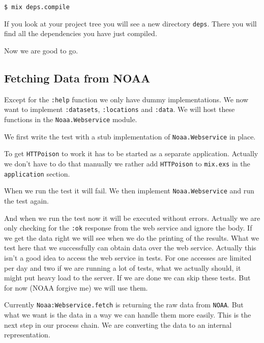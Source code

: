\documentclass[10pt, a4paper]{article}
\newcommand{\includecode}[3]{}
\begin{document}
\texttt{\$ mix deps.compile}

\includecode{mix deps.compile}{lst:mixdepscompile}{listings/mix-deps-compile}

If you look at your project tree you will see a new directory \texttt{deps}. 
There you will find all the dependencies you have just compiled. 

Now we are good to go.

\subsection{Fetching Data from NOAA}
Except for the \texttt{:help} function we only have dummy implementations. We
now want to implement \texttt{:datasets}, \texttt{:locations} and 
\texttt{:data}. We will host these functions in the \texttt{Noaa.Webservice} 
module.

We first write the test with a stub implementation of \texttt{Noaa.Webservice}
in place.

\includecode{lib/noaa/webservice.ex}{lst:webservice}{listings/webservice.ex}

\includecode{test/test\_webservice.exs}{lst:webservicetest}
            {listings/webservice.ex}

To get \texttt{HTTPoison} to work it has to be started as a separate 
application. Actually we don't have to do that manually we rather add 
\texttt{HTTPoison} to \texttt{mix.exs} in the \texttt{application} section.

\includecode{mix.exs with HTTPoison}{lst:mixexsHTTPoison}{listings/mix1.exs}

When we run the test it will fail. We then implement \texttt{Noaa.Webservice} 
and run the test again.

\includecode{list/noaa/webservice.ex}{lst:webservice1}{listings/webservice1.ex}

And when we run the test now it will be executed without errors. Actually we 
are only checking for the \texttt{:ok} response from the web service and ignore
the body. If we get the data right we will see when we do the printing of the
results. What we test here that we successfully can obtain data over the web 
service. Actually this isn't a good idea to access the web service in tests.
For one accesses are limited per day and two if we are running a lot of tests,
what we actually should, it might put heavy load to the server. If we are done
we can skip these tests. But for now (NOAA forgive me) we will use them.

Currently \texttt{Noaa:Webservice.fetch} is returning the raw data from 
\texttt{NOAA}. But what we want is the data in a way we can handle them more
easily. This is the next step in our process chain. We are converting the data
to an internal representation.
\end{document}
